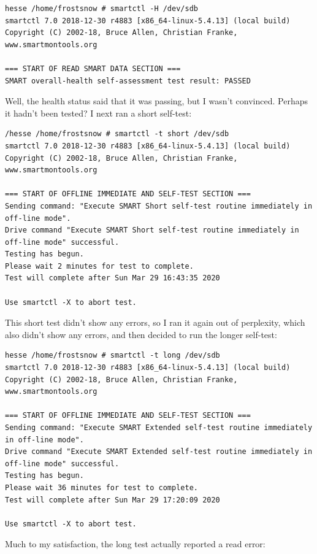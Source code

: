 \documentclass{article}
\begin{document}
\begin{verbatim}
hesse /home/frostsnow # smartctl -H /dev/sdb
smartctl 7.0 2018-12-30 r4883 [x86_64-linux-5.4.13] (local build)
Copyright (C) 2002-18, Bruce Allen, Christian Franke, www.smartmontools.org

=== START OF READ SMART DATA SECTION ===
SMART overall-health self-assessment test result: PASSED
\end{verbatim}

Well, the health status said that it was passing, but I wasn't convinced.  Perhaps it hadn't been tested?  I next ran a short self-test:

\begin{verbatim}
/hesse /home/frostsnow # smartctl -t short /dev/sdb
smartctl 7.0 2018-12-30 r4883 [x86_64-linux-5.4.13] (local build)
Copyright (C) 2002-18, Bruce Allen, Christian Franke, www.smartmontools.org

=== START OF OFFLINE IMMEDIATE AND SELF-TEST SECTION ===
Sending command: "Execute SMART Short self-test routine immediately in off-line mode".
Drive command "Execute SMART Short self-test routine immediately in off-line mode" successful.
Testing has begun.
Please wait 2 minutes for test to complete.
Test will complete after Sun Mar 29 16:43:35 2020

Use smartctl -X to abort test.
\end{verbatim}

This short test didn't show any errors, so I ran it again out of perplexity, which also didn't show any errors, and then decided to run the longer self-test:

\begin{verbatim}
hesse /home/frostsnow # smartctl -t long /dev/sdb
smartctl 7.0 2018-12-30 r4883 [x86_64-linux-5.4.13] (local build)
Copyright (C) 2002-18, Bruce Allen, Christian Franke, www.smartmontools.org

=== START OF OFFLINE IMMEDIATE AND SELF-TEST SECTION ===
Sending command: "Execute SMART Extended self-test routine immediately in off-line mode".
Drive command "Execute SMART Extended self-test routine immediately in off-line mode" successful.
Testing has begun.
Please wait 36 minutes for test to complete.
Test will complete after Sun Mar 29 17:20:09 2020

Use smartctl -X to abort test.
\end{verbatim}

Much to my satisfaction, the long test actually reported a read error:
\end{document}

